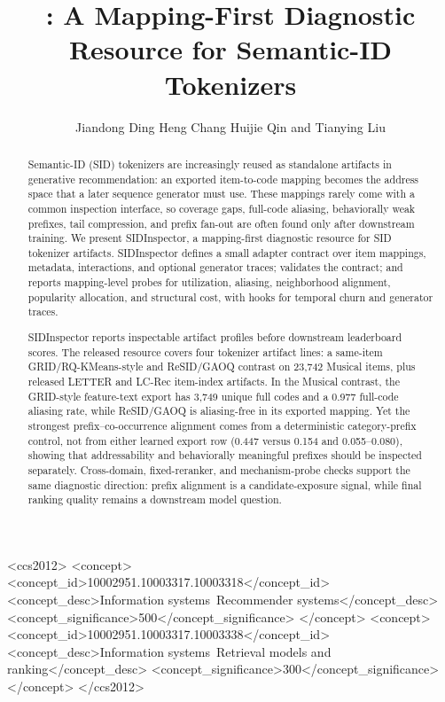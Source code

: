 \documentclass[sigconf,natbib=true]{acmart}
\title{\tool: A Mapping-First Diagnostic Resource for Semantic-ID Tokenizers}
\author{Jiandong Ding\emailcomma{} Heng Chang\emailcomma{} Huijie Qin\emailcomma{} and Tianying Liu}
\affiliation{%
  \institution{Huawei Technologies}
  \city{Shanghai}
  \country{China}
}
\newcommand{\tool}{SIDInspector\xspace}
\newcommand{\sid}{SID\xspace}
\begin{document}
\begin{CCSXML}
<ccs2012>
 <concept>
  <concept_id>10002951.10003317.10003318</concept_id>
  <concept_desc>Information systems~Recommender systems</concept_desc>
  <concept_significance>500</concept_significance>
 </concept>
 <concept>
  <concept_id>10002951.10003317.10003338</concept_id>
  <concept_desc>Information systems~Retrieval models and ranking</concept_desc>
  <concept_significance>300</concept_significance>
 </concept>
</ccs2012>
\end{CCSXML}


\begin{abstract}
Semantic-ID (\sid) tokenizers are increasingly reused as standalone artifacts
in generative recommendation: an exported item-to-code mapping becomes the
address space that a later sequence generator must use. These mappings rarely
come with a common inspection interface, so coverage gaps, full-code aliasing,
behaviorally weak prefixes, tail compression, and prefix fan-out are often
found only after downstream training. We present \tool, a mapping-first
diagnostic resource for \sid tokenizer artifacts. \tool defines a small adapter
contract over item mappings, metadata, interactions, and optional generator
traces; validates the contract; and reports mapping-level probes for
utilization, aliasing, neighborhood alignment, popularity allocation, and
structural cost, with hooks for temporal churn and generator traces.

\tool reports inspectable artifact profiles before downstream leaderboard scores.
The released resource covers four tokenizer artifact lines: a same-item
GRID/RQ-KMeans-style and ReSID/GAOQ contrast on 23,742 Musical items, plus
released LETTER and LC-Rec item-index artifacts. In the Musical contrast, the
GRID-style feature-text export has 3,749 unique full codes and a 0.977
full-code aliasing rate, while ReSID/GAOQ is aliasing-free in its exported
mapping. Yet the strongest prefix--co-occurrence alignment comes from a
deterministic category-prefix control, not from either learned export row
(0.447 versus 0.154 and 0.055--0.080), showing that addressability and
behaviorally meaningful prefixes should be inspected separately. Cross-domain,
fixed-reranker, and mechanism-probe checks support the same diagnostic
direction: prefix alignment is a candidate-exposure signal, while final ranking
quality remains a downstream model question.
\end{abstract}
\end{document}
